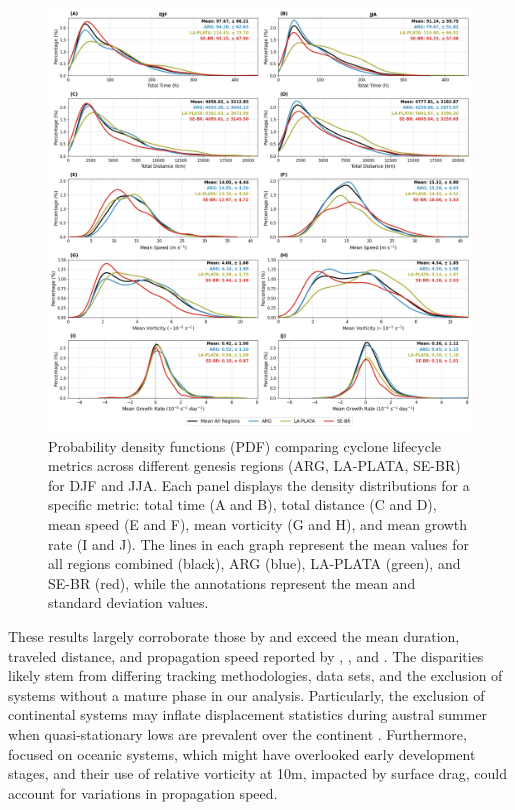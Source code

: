 \begin{figure}[h!]
\centering
\includegraphics[width=\textwidth]{figs_4/pdf_total_phase_all_metrics.png}
\caption[PDF - Metrics for each region and season]{Probability density functions (PDF) comparing cyclone lifecycle metrics across different genesis regions (ARG, LA-PLATA, SE-BR) for DJF and JJA. Each panel displays the density distributions for a specific metric: total time (A and B), total distance (C and D), mean speed (E and F), mean vorticity (G and H), and mean growth rate (I and J). The lines in each graph represent the mean values for all regions combined (black), ARG (blue), LA-PLATA (green), and SE-BR (red), while the annotations represent the mean and standard deviation values.}
\label{fig:pdf_total_time_total}
\end{figure}

These results largely corroborate those by \citet{gramcianinov2019properties, gramcianinov2020analysis, hoskins2005new} and exceed the mean duration, traveled distance, and propagation speed reported by \citet{simmonds2000mean}, \citet{mendes2010climatology}, and \citet{reboita2010south}. The disparities likely stem from differing tracking methodologies, data sets, and the exclusion of systems without a mature phase in our analysis. Particularly, the exclusion of continental systems may inflate displacement statistics during austral summer when quasi-stationary lows are prevalent over the continent \citep{mendes2010climatology}. Furthermore, \citet{reboita2010south} focused on oceanic systems, which might have overlooked early development stages, and their use of relative vorticity at 10m, impacted by surface drag, could account for variations in propagation speed.

